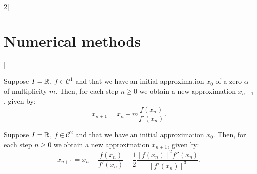 \documentclass[../../../main.tex]{subfiles}
\begin{document}
\begin{multicols}{2}[\section{Numerical methods}]
\begin{theorem}
\end{theorem}
\begin{theorem}
    Suppose $I=\mathbb{R}$, $f\in\mathcal{C}^1$ and that we have an initial approximation $x_0$ of a zero $\alpha$ of multiplicity $m$. Then, for each step $n\geq 0$ we obtain a new approximation $x_{n+1}$, given by: $$x_{n+1}=x_n-m\frac{f(x_n)}{f'(x_n)}.$$
\end{theorem}
\begin{theorem}
    Suppose $I=\mathbb{R}$, $f\in\mathcal{C}^2$ and that we have an initial approximation $x_0$. Then, for each step $n\geq 0$ we obtain a new approximation $x_{n+1}$, given by: $$x_{n+1}=x_n-\frac{f(x_n)}{f'(x_n)}-\frac{1}{2}\frac{\left[f(x_n)\right]^2f''(x_n)}{\left[f'(x_n)\right]^3}.$$
\end{theorem}

\end{multicols}
\end{document}
